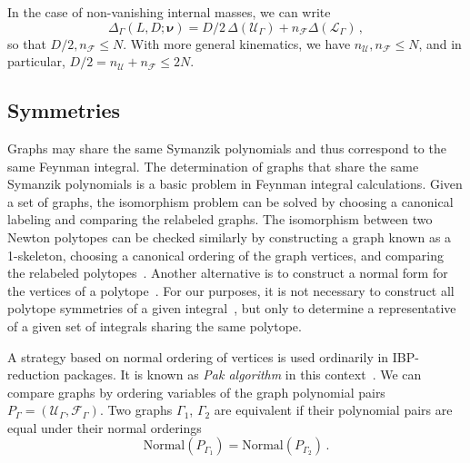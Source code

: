 \documentclass[12pt,a4paper]{article}
\theoremstyle{plain}
\theoremstyle{remark}
\newcommand{\cU}{\mathscr {U}}
\newcommand{\cF}{\mathscr {F}}
\newcommand{\cL}{\mathscr {L}}
\newcommand{\undernotation}[1]{\pmb{#1}}
\newcommand{\Newton}{\Delta}
\begin{document}
In the case of non-vanishing internal masses, we can write 
\begin{equation}
\Newton_\Gamma(L, D; \undernotation{\nu}) = D/2 \, \Newton (\cU_\Gamma) + n_\cF \Newton(\cL_\Gamma)\,,
\end{equation}
 so that $D/2, n_\cF \leq N $.
With more general kinematics, we have \(n_\cU, n_\cF \leq N\), and in particular, \(D/2 = n_\cU + n_\cF \leq 2N\).


%
\subsection{Symmetries}
Graphs may share the same Symanzik polynomials and thus correspond to the same Feynman integral. The determination of graphs that share the same Symanzik polynomials is a basic problem in Feynman integral calculations. Given a set of graphs, the isomorphism problem can be solved by choosing a canonical labeling and comparing the relabeled graphs. The isomorphism between two Newton polytopes can be checked similarly by constructing a graph known as a 1-skeleton, choosing a canonical ordering of the graph vertices, and comparing the relabeled polytopes~\cite{Bremner_2014}. Another alternative is to construct a normal form for the vertices of a polytope~\cite{grinis2013normalformsconvexlattice}.  For our purposes, it is not necessary to construct all polytope symmetries of a given integral~\cite{delaCruz:2024ssb}, but only to determine a representative of a given set of integrals sharing the same polytope.  

A strategy based on normal ordering of vertices is used ordinarily in IBP-reduction packages. It is known as \emph{Pak algorithm} in this context~\cite{Pak:2011xt}.  We can compare graphs by ordering variables of the graph polynomial pairs 
$P_\Gamma=(\cU_\Gamma, \cF_\Gamma)$. Two graphs $ \Gamma_1$, $\Gamma_2$ are equivalent if their polynomial pairs are equal under their normal orderings
\begin{equation}
	\text{Normal}(P_{\Gamma_1})
	=\text{Normal}(P_{\Gamma_2}) \, . 
\end{equation}
%
\end{document}
